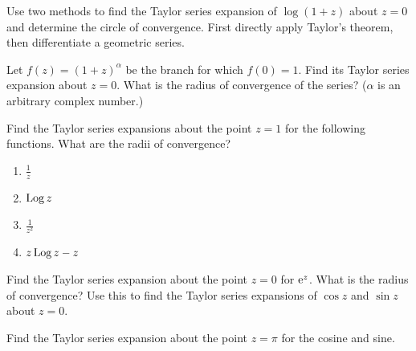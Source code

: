 {%
\begin{Exercise}
  \label{exercise taylor log(1+z)}
  Use two methods to find the Taylor series expansion of $\log(1 + z)$ about 
  $z = 0$ and determine the circle of convergence.  First directly apply 
  Taylor's theorem, then differentiate a geometric series.

\end{Exercise}


\begin{Exercise}
  \label{exercise taylor (1+z)^a}
  Let $f(z) = (1 + z)^\alpha$ be the branch for which $f(0) = 1$.
  Find its Taylor series expansion about $z = 0$.
  What is the radius of convergence of the series?
  ($\alpha$ is an arbitrary complex number.)

\end{Exercise}


\begin{Exercise}
  \label{exercise taylor series 1/z}
  Find the Taylor series expansions about the point $z = 1$ 
  for the following functions.  What are the radii of convergence?
  \begin{enumerate}
  \item $\displaystyle \frac{1}{z}$
  \item $\displaystyle \mathop{\mathrm{Log}}\nolimits z$
  \item $\displaystyle \frac{1}{z^2}$
  \item $\displaystyle z \mathop{\mathrm{Log}}\nolimits z - z$
  \end{enumerate}

\end{Exercise}


\begin{Exercise}
  \label{exercise taylor exp cos sin}
  Find the Taylor series expansion about the point $z = 0$ 
  for $\mathop{\mathrm{e}}\nolimits^z$.  What is the radius of convergence?
  Use this to find the Taylor series expansions of $\cos z$ and $\sin z$
  about $z = 0$.

\end{Exercise}


\begin{Exercise}
  \label{exercise taylor cosine sine}
  Find the Taylor series expansion about the point $z = \pi$ 
  for the cosine and sine.
  
\end{Exercise}






}

